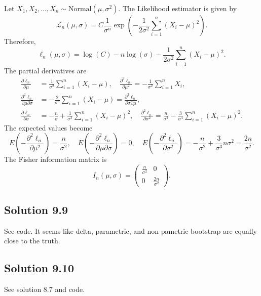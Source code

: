 Let $X_1, X_2, ..., X_n \sim \mathrm{Normal}(\mu, \sigma^2)$.
The Likelihood estimator is given by
\begin{equation*}
    \mathcal{L}_n(\mu, \sigma) = C \frac{1}{\sigma^n} \exp\left(-\frac{1}{2\sigma^2} \sum_{i=1}^n (X_i - \mu)^2\right).
\end{equation*}
Therefore,
\begin{equation*}
    \ell_n(\mu, \sigma) = \log(C) - n\log(\sigma) - \frac{1}{2\sigma^2} \sum_{i = 1}^n (X_i - \mu)^2.
\end{equation*}
The partial derivatives are
\begin{equation*}
    \begin{split}
        \frac{\partial \ell_n}{\partial \mu} &= \frac{1}{\sigma^2} \sum_{i = 1}^n (X_i - \mu), \quad
        \frac{\partial^2 \ell_n}{\partial \mu^2} = -\frac{1}{\sigma^2} \sum_{i = 1}^n X_i, \\
        \frac{\partial^2 \ell_n}{\partial \mu \partial \sigma} &= -\frac{2}{\sigma^3} \sum_{i = 1}^n (X_i - \mu) = \frac{\partial^2 \ell_n}{\partial \sigma \partial \mu}, \\
        \frac{\partial \ell_n}{\partial \sigma} &= -\frac{n}{\sigma} + \frac{1}{\sigma^3} \sum_{i = 1}^n (X_i - \mu)^2, \quad
        \frac{\partial^2 \ell_n}{\partial \sigma^2} = \frac{n}{\sigma^2} - \frac{3}{\sigma^4} \sum_{i = 1}^n (X_i - \mu)^2.
    \end{split}
\end{equation*}
The expected values become
\begin{equation*}
    E\left(-\frac{\partial^2 \ell_n}{\partial \mu^2}\right)
        = \frac{n}{\sigma^2}, \quad
    E\left(-\frac{\partial^2 \ell_n}{\partial \mu \partial \sigma}\right)
        = 0, \quad
    E\left(-\frac{\partial^2 \ell_n}{\partial \sigma^2}\right)
        = -\frac{n}{\sigma^2} + \frac{3}{\sigma^3} n\sigma^2
        = \frac{2n}{\sigma^2}.
\end{equation*}
The Fisher information matrix is
\begin{equation*}
    I_n(\mu, \sigma) = \left( \begin{matrix}
        \frac{n}{\sigma^2} & 0 \\
        0 & \frac{2n}{\sigma^2}
    \end{matrix} \right).
\end{equation*}


\subsection*{Solution 9.9}

See code.
It seems like delta, parametric, and non-pametric bootstrap are equally close to the truth.


\subsection*{Solution 9.10}

See solution 8.7 and code.
